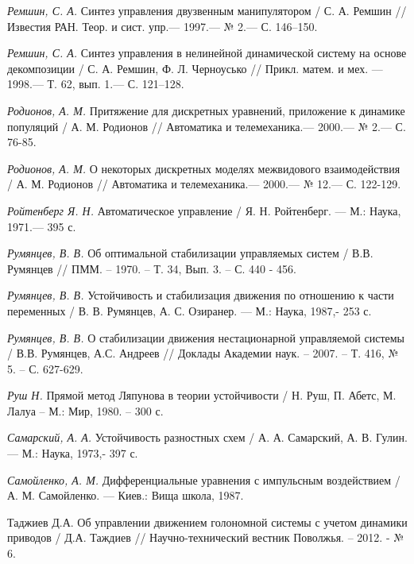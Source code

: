 \begin{thebibliography}{10}
	{\it Ремшин, С. А.} Синтез управления двузвенным манипулятором /
	С. А. Ремшин // Известия РАН. Теор. и сист. упр.— 1997.— № 2.— С. 146–150.
	
	{\it Ремшин, С. А.} Синтез управления в нелинейной динамической систему на основе декомпозиции /
	С. А. Ремшин, Ф. Л. Черноусько // Прикл. матем. и мех. — 1998.— Т. 62, вып. 1.— С. 121–128.
	
	
	{\it Родионов, А. М.} Притяжение для дискретных уравнений, приложение к динамике популяций
	/ А. М. Родионов // Автоматика и телемеханика.— 2000.— № 2.— С. 76-85.
	
	{\it Родионов, А. М.} О некоторых дискретных моделях межвидового взаимодействия
	/ А. М. Родионов // Автоматика и телемеханика.— 2000.— № 12.— С. 122-129.
	
	{\it Ройтенберг Я. Н.} Автоматическое управление /
	Я. Н. Ройтенберг. — М.: Наука, 1971.— 395 с.
	
	{\it Румянцев, В. В.} Об оптимальной стабилизации управляемых систем / В.В. Румянцев // ПММ. – 1970. – Т. 34, Вып. 3. – С. 440 - 456.
	
	{\it Румянцев, В. В.} Устойчивость и стабилизация движения по отношению к части переменных /
	В. В. Румянцев, А. С. Озиранер. — М.: Наука, 1987,- 253 с.
	
	{\it Румянцев, В. В.} О стабилизации движения нестационарной управляемой системы / В.В. Румянцев, А.С. Андреев // Доклады Академии наук. – 2007. – Т. 416, № 5. – С. 627-629.
	
	
	{\it Руш Н.} Прямой метод Ляпунова в теории устойчивости / Н. Руш, П. Абетс, М. Лалуа – М.: Мир, 1980. – 300 с.
	
	{\it Самарский, А. А.} Устойчивость разностных схем /
	А. А. Самарский, А. В. Гулин. — М.: Наука, 1973,- 397 с.
	
	{\it Самойленко, А. М.} Дифференциальные уравнения с импульсным воздействием /
	А. М. Самойленко. — Киев.: Вища школа, 1987.
	
	Таджиев Д.А. Об управлении движением голономной системы с учетом динамики приводов / Д.А. Таждиев // Научно-технический вестник Поволжья. – 2012. - № 6. 
	

\end{thebibliography}
